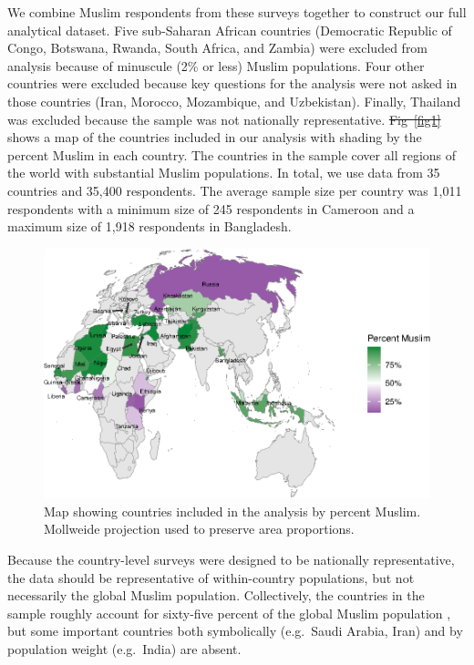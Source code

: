 \documentclass[10pt,letterpaper]{article}
\providecommand{\DIFaddtex}[1]{{\protect\color{blue}\uwave{#1}}} %
\providecommand{\DIFdeltex}[1]{{\protect\color{red}\sout{#1}}}                      %
\providecommand{\DIFaddbegin}{} %
\providecommand{\DIFaddend}{} %
\providecommand{\DIFdelbegin}{} %
\providecommand{\DIFdelend}{} %
\providecommand{\DIFaddbeginFL}{} %
\providecommand{\DIFaddendFL}{} %
\providecommand{\DIFdelbeginFL}{} %
\providecommand{\DIFdelendFL}{} %
\providecommand{\DIFadd}[1]{\texorpdfstring{\DIFaddtex{#1}}{#1}} %
\providecommand{\DIFdel}[1]{\texorpdfstring{\DIFdeltex{#1}}{}} %
\newcommand{\DIFscaledelfig}{0.5}
\newlength{\DIFdelgraphicswidth} %
\newlength{\DIFdelgraphicsheight} %
\newcommand{\DIFaddincludegraphics}[2][]{{\color{blue}\fbox{\DIFOincludegraphics[#1]{#2}}}} %
\newcommand{\DIFdelincludegraphics}[2][]{%
\sbox{\DIFdelgraphicsbox}{\DIFOincludegraphics[#1]{#2}}%
\settoboxwidth{\DIFdelgraphicswidth}{\DIFdelgraphicsbox} %
\settoboxtotalheight{\DIFdelgraphicsheight}{\DIFdelgraphicsbox} %
\scalebox{\DIFscaledelfig}{%
\parbox[b]{\DIFdelgraphicswidth}{\usebox{\DIFdelgraphicsbox}\\[-\baselineskip] \rule{\DIFdelgraphicswidth}{0em}}\llap{\resizebox{\DIFdelgraphicswidth}{\DIFdelgraphicsheight}{%
\setlength{\unitlength}{\DIFdelgraphicswidth}%
\begin{picture}(1,1)%
\thicklines\linethickness{2pt} %
{\color[rgb]{1,0,0}\put(0,0){\framebox(1,1){}}}%
{\color[rgb]{1,0,0}\put(0,0){\line( 1,1){1}}}%
{\color[rgb]{1,0,0}\put(0,1){\line(1,-1){1}}}%
\end{picture}%
}\hspace*{3pt}}} %
} %
\DeclareRobustCommand{\DIFaddbegin}{\DIFOaddbegin \let\includegraphics\DIFaddincludegraphics} %
\DeclareRobustCommand{\DIFaddend}{\DIFOaddend \let\includegraphics\DIFOincludegraphics} %
\DeclareRobustCommand{\DIFdelbegin}{\DIFOdelbegin \let\includegraphics\DIFdelincludegraphics} %
\DeclareRobustCommand{\DIFdelend}{\DIFOaddend \let\includegraphics\DIFOincludegraphics} %
\DeclareRobustCommand{\DIFaddbeginFL}{\DIFOaddbeginFL \let\includegraphics\DIFaddincludegraphics} %
\DeclareRobustCommand{\DIFaddendFL}{\DIFOaddendFL \let\includegraphics\DIFOincludegraphics} %
\DeclareRobustCommand{\DIFdelbeginFL}{\DIFOdelbeginFL \let\includegraphics\DIFdelincludegraphics} %
\DeclareRobustCommand{\DIFdelendFL}{\DIFOaddendFL \let\includegraphics\DIFOincludegraphics} %
\begin{document}
We combine Muslim respondents from these surveys together to construct our full analytical dataset. Five sub-Saharan African countries (Democratic Republic of Congo, Botswana, Rwanda, South Africa, and Zambia) were excluded from analysis because of minuscule (2\% or less) Muslim populations. Four other countries were excluded because key questions for the analysis were not asked in those countries (Iran, Morocco, Mozambique, and Uzbekistan). Finally, Thailand was excluded because the sample was not nationally representative. \DIFdelbegin \DIFdel{Fig~\ref{fig1} }\DIFdelend \DIFaddbegin \DIFadd{Figure \ref{fig:figure-world-map} }\DIFaddend shows a map of the countries included in our analysis with shading by the percent Muslim in each country. The countries in the sample cover all regions of the world with substantial Muslim populations. In total, we use data from 35 countries and 35,400 respondents. The average sample size per country was 1,011 respondents with a minimum size of 245 respondents in Cameroon and a maximum size of 1,918 respondents in Bangladesh.

\begin{figure}[!h]
\centering
\includegraphics{figures/fig1.eps}
\caption{Map showing countries included in the analysis by percent
Muslim. Mollweide projection used to preserve area proportions.}
\DIFdelbeginFL %
\DIFdelendFL \DIFaddbeginFL \label{fig:figure-world-map}
\DIFaddendFL %
\end{figure}

Because the country-level surveys were designed to be nationally representative, the data should be representative of within-country populations, but not necessarily the global Muslim population. Collectively, the countries in the sample roughly account for sixty-five percent of the global Muslim population \cite{pewforumonreligionandpubliclife_global_2012}, but some important countries both symbolically (e.g.~Saudi Arabia, Iran) and by population weight (e.g.~India) are absent.
\end{document}
